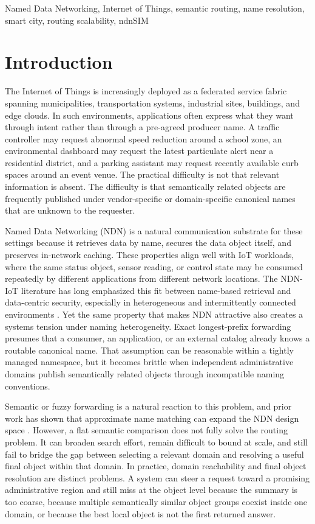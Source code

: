 \documentclass[journal]{IEEEtran}
\begin{document}
\begin{IEEEkeywords}
Named Data Networking, Internet of Things, semantic routing, name resolution, smart city, routing scalability, ndnSIM
\end{IEEEkeywords}

\section{Introduction}

The Internet of Things is increasingly deployed as a federated service fabric spanning municipalities, transportation systems, industrial sites, buildings, and edge clouds. In such environments, applications often express what they want through intent rather than through a pre-agreed producer name. A traffic controller may request abnormal speed reduction around a school zone, an environmental dashboard may request the latest particulate alert near a residential district, and a parking assistant may request recently available curb spaces around an event venue. The practical difficulty is not that relevant information is absent. The difficulty is that semantically related objects are frequently published under vendor-specific or domain-specific canonical names that are unknown to the requester.

Named Data Networking (NDN) is a natural communication substrate for these settings because it retrieves data by name, secures the data object itself, and preserves in-network caching. These properties align well with IoT workloads, where the same status object, sensor reading, or control state may be consumed repeatedly by different applications from different network locations. The NDN-IoT literature has long emphasized this fit between name-based retrieval and data-centric security, especially in heterogeneous and intermittently connected environments \cite{ndn_iot_invited,inf_ndn,sanr}. Yet the same property that makes NDN attractive also creates a systems tension under naming heterogeneity. Exact longest-prefix forwarding presumes that a consumer, an application, or an external catalog already knows a routable canonical name. That assumption can be reasonable within a tightly managed namespace, but it becomes brittle when independent administrative domains publish semantically related objects through incompatible naming conventions.

Semantic or fuzzy forwarding is a natural reaction to this problem, and prior work has shown that approximate name matching can expand the NDN design space \cite{fuzzy,semantic_distribution}. However, a flat semantic comparison does not fully solve the routing problem. It can broaden search effort, remain difficult to bound at scale, and still fail to bridge the gap between selecting a relevant domain and resolving a useful final object within that domain. In practice, domain reachability and final object resolution are distinct problems. A system can steer a request toward a promising administrative region and still miss at the object level because the summary is too coarse, because multiple semantically similar object groups coexist inside one domain, or because the best local object is not the first returned answer.
\end{document}
